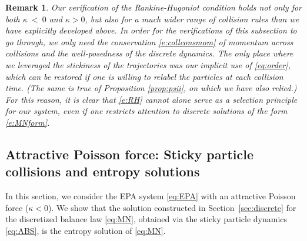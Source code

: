 \documentclass[10pt,a4paper]{amsart}
\newtheorem{remark}{Remark}
\begin{document}
	\begin{remark}
		Our verification of the Rankine-Hugoniot condition holds not only for both $\kappa~<~0$ and $\kappa>0$, but also for a much wider range of collision rules than we have explicitly developed above.  In order for the verifications of this subsection to go through, we only need the conservation \eqref{e:collconsmom} of momentum across collisions and the well-posedness of the discrete dynamics. The only place where we leveraged the stickiness of the trajectories was our implicit use of \eqref{eq:order}, which can be restored if one is willing to relabel the particles at each collision time.  (The same is true of Proposition \ref{prop:psii}, on which we have also relied.)  
		For this reason, it is clear that \eqref{e:RH} cannot alone serve as a selection principle for our system, even if one restricts attention to discrete solutions of the form \eqref{e:MNform}.
	\end{remark}
	
	\subsection{Attractive Poisson force: Sticky particle collisions and entropy solutions}\label{sec:attractive}
	

	
	In this section, we consider the EPA system \eqref{eq:EPA} with an attractive Poisson force ($\kappa<0$). We show that the solution constructed in Section~\ref{sec:discrete} for the discretized balance law \eqref{eq:MN}, obtained via the sticky particle dynamics \eqref{eq:ABS}, is the entropy solution of \eqref{eq:MN}.
	
\end{document}
